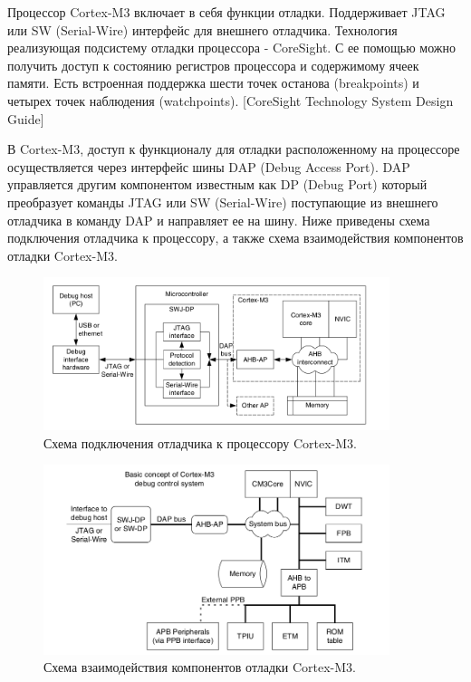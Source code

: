 Процессор Cortex-M3 включает в себя функции отладки. Поддерживает JTAG или SW (Serial-Wire) интерфейс для внешнего отладчика. Технология реализующая подсистему отладки процессора - CoreSight. С ее помощью можно получить доступ к состоянию регистров процессора и содержимому ячеек памяти. Есть встроенная поддержка шести точек останова (breakpoints) и четырех точек наблюдения (watchpoints). [CoreSight Technology System Design Guide]

В Cortex-M3, доступ к функционалу для отладки расположенному на процессоре осуществляется через интерфейс шины DAP (Debug Access Port). DAP управляется другим компонентом известным как DP (Debug Port) который преобразует команды JTAG или SW (Serial-Wire) поступающие из внешнего отладчика в команду DAP и направляет ее на шину. Ниже приведены схема подключения отладчика к процессору, а также  схема взаимодействия компонентов отладки Cortex-M3. 


\begin{figure}[h!]
    \centering
    \includegraphics[width=0.9\textwidth]{cortex_m3_debug_connection.png}
    \caption{Схема подключения отладчика к процессору Cortex-M3.}
\end{figure}


\begin{figure}[h!]
    \centering
    \includegraphics[width=0.9\textwidth]{cortex_m3_inside_debug_subsystem.png}
    \caption{Схема взаимодействия компонентов отладки Cortex-M3.}
\end{figure}


